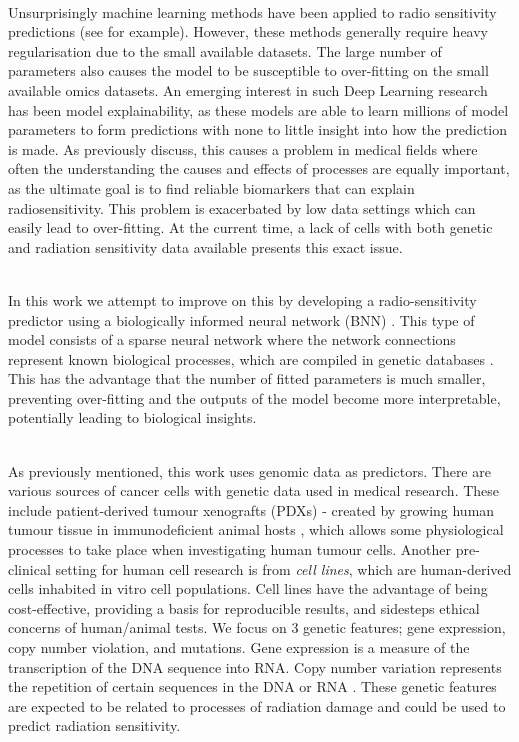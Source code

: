 \documentclass[NOTE, disdraft=true, UKenglish]{\DISCDTLATEXPATH UCLCDTDISdoc}
\begin{document}
\\ \indent Unsurprisingly machine learning methods have been applied to radio sensitivity predictions (see for example\cite{speers2015development}). However, these methods generally require heavy regularisation due to the small available datasets. The large number of parameters also causes the model to be susceptible to over-fitting on the small available omics datasets. An emerging interest in such Deep Learning research has been model explainability, as these models are able to learn millions of model parameters to form predictions with none to little insight into how the prediction is made. As previously discuss, this causes a problem in medical fields where often the understanding the causes and effects of processes are equally important, as the ultimate goal is to find reliable biomarkers that can explain radiosensitivity. This problem is exacerbated by low data settings which can easily lead to over-fitting. At the current time, a lack of cells with both genetic and radiation sensitivity data available presents this exact issue. 

\\ \indent  In this work we attempt to improve on this by developing a radio-sensitivity predictor using a biologically informed neural network (BNN) \cite{review,review_2}. This type of model consists of a sparse neural network where the network connections represent known biological processes, which are compiled in genetic databases \cite{reactome,go_1,go_2}. This has the advantage that the number of fitted parameters is much smaller, preventing over-fitting and the outputs of the model become more interpretable, potentially leading to biological insights.

\\ \indent As previously mentioned, this work uses genomic data as predictors. There are various sources of cancer cells with genetic data used in medical research. These include patient-derived tumour xenografts (PDXs) - created by growing human tumour tissue in immunodeficient animal hosts \cite{PDX}, which allows some physiological processes to take place when investigating human tumour cells. Another pre-clinical setting for human cell research is from \textit{cell lines}, which are human-derived cells inhabited in vitro cell populations. Cell lines have the advantage of being cost-effective, providing a basis for reproducible results, and sidesteps ethical concerns of human/animal tests. We focus on 3 genetic features; gene expression, copy number violation, and mutations.  Gene expression is a measure of the transcription of the DNA sequence into RNA.
Copy number variation represents the repetition of certain sequences in the DNA or RNA \cite{CNV}. These genetic features are expected to be related to processes of radiation damage \cite{rev_radio} and could be used to predict radiation sensitivity.
\end{document}
